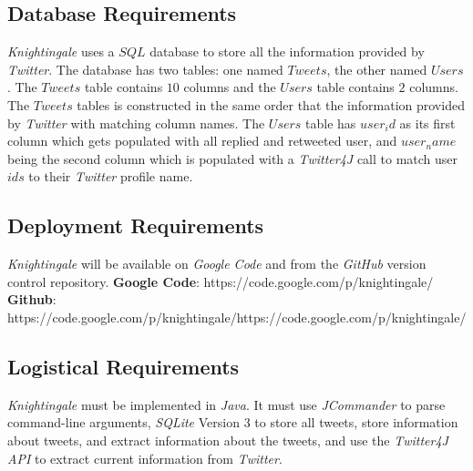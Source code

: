 \documentclass[a4paper, 12pt]{article}
\begin{document}
\subsection{Database Requirements} \label{sec:database}
\begin{adjustwidth}{2em}{0pt}
\textit{Knightingale} uses a $SQL$ database to store all the information provided by \textit{Twitter}. The database has two tables: one named $Tweets$, the other named $Users$. The $Tweets$ table contains $10$ columns and the $Users$ table contains $2$ columns. The $Tweets$ tables is constructed in the same order that the information provided by \textit{Twitter} with matching column names. The $Users$ table has $user_id$ as its first column which gets populated with all replied and retweeted user, and $user_name$ being the second column which is populated with a \textit{Twitter4J} call to match user $ids$ to their \textit{Twitter} profile name.
\end{adjustwidth}

\subsection{Deployment Requirements} \label{sec:deployment}
\begin{adjustwidth}{2em}{0pt}
\textit{Knightingale} will be available on \textit{Google Code} and from the \textit{GitHub} version control repository. \newline
\noindent \textbf{Google Code}: https://code.google.com/p/knightingale/ \newline
\noindent \textbf{Github}: https://code.google.com/p/knightingale/https://code.google.com/p/knightingale/
\end{adjustwidth}

\subsection{Logistical Requirements} \label{sec:logistic}
\begin{adjustwidth}{2em}{0pt}
\textit{Knightingale} must be implemented in \textit{Java}. It must use \textit{JCommander} to parse command-line arguments, \textit{SQLite} Version $3$ to store all tweets, store information about tweets, and extract information about the tweets, and use the \textit{Twitter4J API} to extract current information from \textit{Twitter}.
\end{adjustwidth} 
\end{document}
